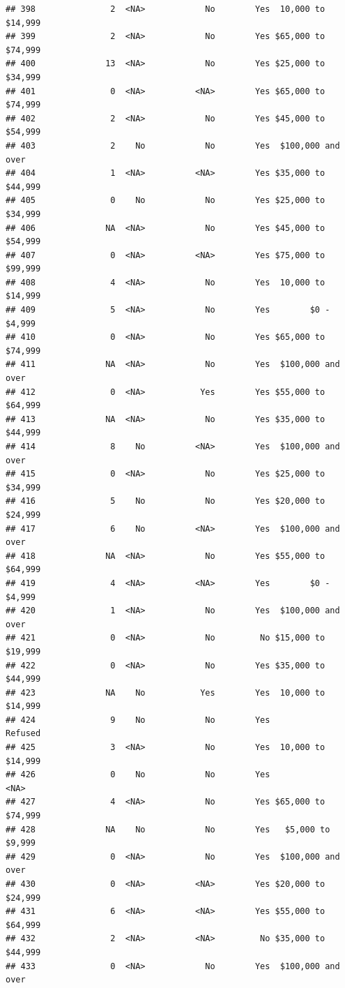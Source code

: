 \documentclass[man]{apa6}
\begin{document}
\begin{verbatim}
## 398               2  <NA>            No        Yes  10,000 to $14,999
## 399               2  <NA>            No        Yes $65,000 to $74,999
## 400              13  <NA>            No        Yes $25,000 to $34,999
## 401               0  <NA>          <NA>        Yes $65,000 to $74,999
## 402               2  <NA>            No        Yes $45,000 to $54,999
## 403               2    No            No        Yes  $100,000 and over
## 404               1  <NA>          <NA>        Yes $35,000 to $44,999
## 405               0    No            No        Yes $25,000 to $34,999
## 406              NA  <NA>            No        Yes $45,000 to $54,999
## 407               0  <NA>          <NA>        Yes $75,000 to $99,999
## 408               4  <NA>            No        Yes  10,000 to $14,999
## 409               5  <NA>            No        Yes        $0 - $4,999
## 410               0  <NA>            No        Yes $65,000 to $74,999
## 411              NA  <NA>            No        Yes  $100,000 and over
## 412               0  <NA>           Yes        Yes $55,000 to $64,999
## 413              NA  <NA>            No        Yes $35,000 to $44,999
## 414               8    No          <NA>        Yes  $100,000 and over
## 415               0  <NA>            No        Yes $25,000 to $34,999
## 416               5    No            No        Yes $20,000 to $24,999
## 417               6    No          <NA>        Yes  $100,000 and over
## 418              NA  <NA>            No        Yes $55,000 to $64,999
## 419               4  <NA>          <NA>        Yes        $0 - $4,999
## 420               1  <NA>            No        Yes  $100,000 and over
## 421               0  <NA>            No         No $15,000 to $19,999
## 422               0  <NA>            No        Yes $35,000 to $44,999
## 423              NA    No           Yes        Yes  10,000 to $14,999
## 424               9    No            No        Yes            Refused
## 425               3  <NA>            No        Yes  10,000 to $14,999
## 426               0    No            No        Yes               <NA>
## 427               4  <NA>            No        Yes $65,000 to $74,999
## 428              NA    No            No        Yes   $5,000 to $9,999
## 429               0  <NA>            No        Yes  $100,000 and over
## 430               0  <NA>          <NA>        Yes $20,000 to $24,999
## 431               6  <NA>          <NA>        Yes $55,000 to $64,999
## 432               2  <NA>          <NA>         No $35,000 to $44,999
## 433               0  <NA>            No        Yes  $100,000 and over

\end{verbatim}
\end{document}
